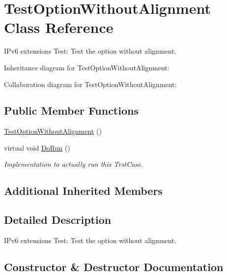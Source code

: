 \hypertarget{classTestOptionWithoutAlignment}{}\section{Test\+Option\+Without\+Alignment Class Reference}
\label{classTestOptionWithoutAlignment}


I\+Pv6 extensions Test\+: Test the option without alignment.  




Inheritance diagram for Test\+Option\+Without\+Alignment\+:


Collaboration diagram for Test\+Option\+Without\+Alignment\+:
\subsection*{Public Member Functions}
\begin{DoxyCompactItemize}
\item 
\hyperlink{classTestOptionWithoutAlignment_acbe1226956a8a88e3dc3baa6c1338d2e}{Test\+Option\+Without\+Alignment} ()
\item 
virtual void \hyperlink{classTestOptionWithoutAlignment_a23bf45b7de739a1c5b2521dee904e95b}{Do\+Run} ()
\begin{DoxyCompactList}\small\item\em Implementation to actually run this Test\+Case. \end{DoxyCompactList}\end{DoxyCompactItemize}
\subsection*{Additional Inherited Members}


\subsection{Detailed Description}
I\+Pv6 extensions Test\+: Test the option without alignment. 

\subsection{Constructor \& Destructor Documentation}
